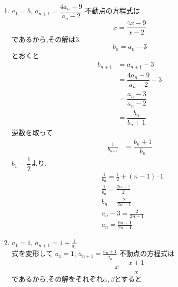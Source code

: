 \begin{enumerate}[label=(\arabic*),parsep=3pt]
\[        \]
        と置くと,
        \begin{align*}
           & b_{n+1}=-\frac13 b_n,\quad b_1=\frac{a_1-2}{a_1+2}=\frac{-2}{2}=-1          \\
           & \therefore \quad b_n=(-1)\left(-\frac13\right)^{n-1}=\frac{(-1)^n}{3^{n-1}}
        \end{align*}
        \[
          b_n=\frac{a_n-2}{a_n+2}
        \]
        を$a_n$について解くと,
        \[
          a_n=\frac{2(1+b_n)}{1-b_n}
        \]
        となるので,
        \[
          b_n=\frac{(-1)^n}{3^{n-1}}
        \]
        を代入し,分母分子に$3^{n-1}$を掛けて整理すると,
        \[
          a_n=\frac{2\left(3^{n-1}+(-1)^n\right)}{3^{n-1}-(-1)^n}
        \]
        を得る.
  \item $\displaystyle a_1=5,\, a_{n+1}=\dfrac{4a_{n}-9}{a_{n}-2}$
        不動点の方程式は
        \[
          x=\frac{4x-9}{x-2}
        \]
        であるから,その解は3.
        \[
          b_n=a_n-3
        \]
        とおくと
        \begin{align*}
          b_{n+1} & =a_{n+1}-3                   \\
                  & =\dfrac{4a_{n}-9}{a_{n}-2}-3 \\
                  & =\dfrac{a_{n}-3}{a_{n}-2}    \\
                  & =\dfrac{b_{n}}{b_{n}+1}
        \end{align*}
        逆数を取って
        \begin{align*}
          \frac{1}{b_{n+1}} & =\dfrac{b_{n}+1}{b_{n}}
        \end{align*}
        $b_1=\dfrac{1}{2}$より,
        \begin{align*}
           & \frac{1}{b_n}=\frac{1}{2}+(n-1)\cdot 1 \\
           & \frac{1}{b_n}=\frac{2n-1}{2}           \\
           & b_n=\frac{2}{2n-1}                     \\
           & a_n-3=\frac{2}{2n-1}                   \\
           & a_n=\frac{6n-1}{2n-1}
        \end{align*}
  \item $\displaystyle a_1=1,\, a_{n+1}=1+\frac{1}{a_n}$\\
        式を変形して
        $\displaystyle a_1=1,\, a_{n+1}=\frac{a_n+1}{a_n}$
        不動点の方程式は
        \[
          x=\frac{x+1}{x}\tag{1}
        \]
        であるから,その解をそれぞれ$\alpha,\beta$とすると

\end{enumerate}
